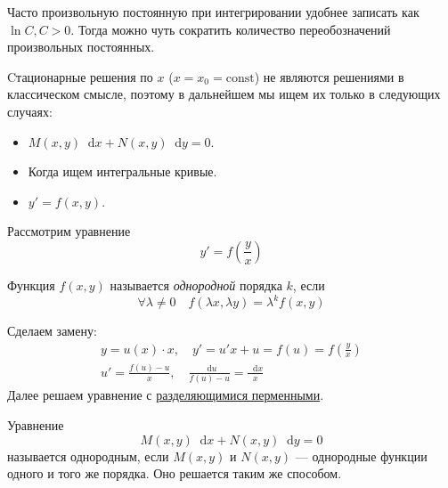 \documentclass[12pt,a4paper]{article}
\numberwithin{equation}{section}
\newcommand{\dd}{\mathop{}\!\mathrm{d}}
\begin{document}
\begin{remarkHSE}
Часто произвольную постоянную при интегрировании удобнее записать как \(\ln C, C > 0\). Тогда можно чуть сократить количество переобозначений произвольных постоянных.
\end{remarkHSE}

Cтационарные решения по \(x\) (\(x=x_0=\text{const}\)) не являются решениями в классическом смысле, поэтому в дальнейшем мы ищем их только в следующих случаях:

\begin{itemize}
\item \(M(x,y)\dd x+N(x,y)\dd y=0\).
\item Когда ищем интегральные кривые.
\item \(y'=f(x,y)\).
\end{itemize}

\label{box:type3}
\begin{definitionHSE}
Рассмотрим уравнение
\[y'=f\left(\frac{y}{x}\right)\]
\begin{definitionHSE}
Функция \(f(x,y)\) называется \textit{однородной} порядка \(k\), если
\[\forall\lambda\neq0\quad f(\lambda x,\lambda y)=\lambda^kf(x,y)\]
\end{definitionHSE}
Сделаем замену:
\vspace{-\baselineskip}
\begin{gather*}
y=u(x)\cdot x,\quad y'=\boxed{u'x+u=f(u)}=f\left(\frac{y}{x}\right)\\
u'=\frac{f(u)-u}{x},\quad\frac{\dd u}{f(u)-u}=\frac{\dd x}{x}
\end{gather*}
Далее решаем уравнение с \hyperref[box:type1]{разделяющимися перменными}.
\end{definitionHSE}
Уравнение
\[M(x,y)\dd x+N(x,y)\dd y=0\]
называется однородным, если \(M(x,y)\) и \(N(x,y)\) --- однородные функции одного и того же порядка. Оно решается таким же способом.
\end{document}
